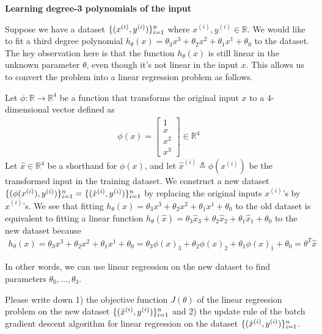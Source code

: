 \item {} {\bf Learning degree-3 polynomials of the input}

Suppose we have a dataset $\{(x^{(i)}, y^{(i)})\}_{i=1}^{{n}}$ where $x^{(i)}, y^{(i)} \in \mathbb{R}$. We would like to fit a third degree polynomial $h_{\theta}(x) = \theta_3x^3 + \theta_2x^2 + \theta_1x^1 + \theta_0$ to the dataset. The key observation here is that the function $h_{\theta}(x)$ is still linear in the unknown parameter $\theta$, even though it's not linear in the input $x$. This allows us to convert the problem into a linear regression problem as follows. 
	
Let $\phi:\mathbb{R}\rightarrow \mathbb{R}^4$ be a function that transforms the original input $x$ to a $4$-dimensional vector defined as
\begin{align}
\phi(x) = \left[\begin{array}{c} 1\\ x \\ x^2 \\ x^3 \end{array}\right]\in \mathbb{R}^4 \label{eqn:feature}
\end{align}
Let $\hat{x}\in \mathbb{R}^4$ be a shorthand for $\phi(x)$, and let $\hat{x}^{(i)} \triangleq \phi(x^{(i)})$ be the transformed input in the training dataset. We construct a new dataset $\{(\phi(x^{(i)}), y^{(i)})\}_{i=1}^{{n}} = \{(\hat{x}^{(i)}, y^{(i)})\}_{i=1}^{{n}}$ by replacing the original inputs $x^{(i)}$'s by $\hat{x}^{(i)}$'s.  We see that fitting $h_{\theta}(x) = \theta_3x^3 + \theta_2x^2 + \theta_1x^1 + \theta_0$ to the old dataset is equivalent to fitting a linear function $h_{\theta}(\hat{x}) = \theta_3\hat{x}_3 +  \theta_2\hat{x}_2 + \theta_1\hat{x}_1 + \theta_0$ to the new dataset because 
\begin{align}
h_\theta(x) =  \theta_3x^3 + \theta_2x^2 + \theta_1x^1 + \theta_0 =  \theta_3 \phi(x)_3 + \theta_2\phi(x)_2 + \theta_1\phi(x)_1 + \theta_0 = \theta^T \hat{x}
\end{align}
	
In other words, we can use linear regression on the new dataset to find parameters $\theta_0,\dots, \theta_3$.

Please write down 1) the objective function $J(\theta)$ of the linear regression problem on the new dataset $\{(\hat{x}^{(i)}, y^{(i)})\}_{i=1}^{{n}}$ and 2) the update rule of the batch gradient descent algorithm for linear regression on the dataset $\{(\hat{x}^{(i)}, y^{(i)})\}_{i=1}^{{n}}$. 

